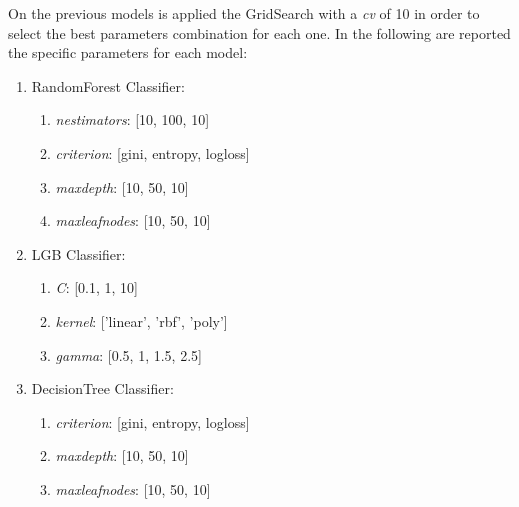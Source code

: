 \documentclass[12pt,a4paper,openright,twoside]{book}
\begin{document}
On the previous models is applied the GridSearch with a \emph{cv} of 10 in order to select the best parameters combination for each one. In the following are reported the specific parameters for each model:

\begin{enumerate}
    
    \item RandomForest Classifier:
    
    \begin{enumerate}
       
        \item \emph{n\textunderscore estimators}: [10, 100, 10]
       
        \item \emph{criterion}: [gini, entropy, log\textunderscore loss]
       
        \item \emph{max\textunderscore depth}: [10, 50, 10]
       
        \item \emph{max\textunderscore leaf\textunderscore nodes}: [10, 50, 10]
    
    \end{enumerate}
    
    \item LGB Classifier:
    
    \begin{enumerate}

        \item \emph{C}: [0.1, 1, 10]

        \item \emph{kernel}: ['linear', 'rbf', 'poly']

        \item \emph{gamma}: [0.5, 1, 1.5, 2.5]

    \end{enumerate}
    
    \item DecisionTree Classifier:
    
    \begin{enumerate}
    
        \item \emph{criterion}: [gini, entropy, log\textunderscore loss]
    
        \item \emph{max\textunderscore depth}: [10, 50, 10]
    
        \item \emph{max\textunderscore leaf\textunderscore nodes}: [10, 50, 10]
    
    
    \end{enumerate}

\end{enumerate}
\end{document}
